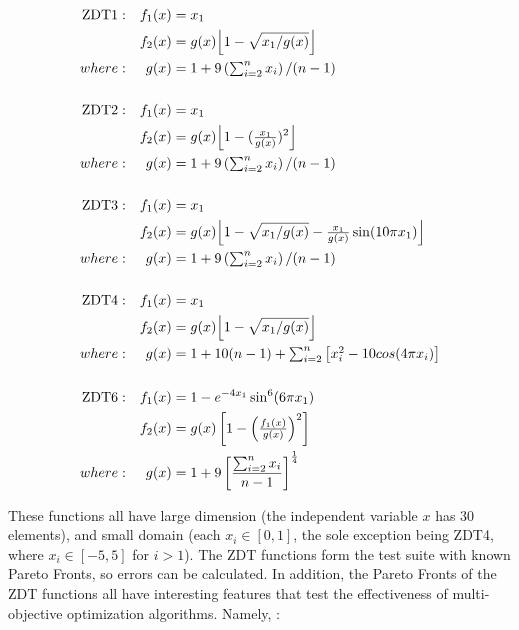 \documentclass[letterpaper, 10 pt, conference]{ieeeconf}  %
\DeclarePairedDelimiter\floor{\lfloor}{\rfloor}
\begin{document}
\begin{align*}
\text{ZDT1}: 	&	& f_1(x) & = x_1 \\
	  		&	& f_2(x) & = g(x) \floor[\Big]{1 - \sqrt{x_1/g(x)}} \\
where: 		& 	& g(x) & = 1 + 9 \left( \textstyle\sum\nolimits_{i=2}^{n} x_i \right)/(n-1) \\
\\
\text{ZDT2}: 	&	& f_1(x) & = x_1 \\
	  		&	& f_2(x) & = g(x) \floor[\Big]{1 - (\tfrac{x_1}{g(x)}) ^2} \\
where: 		& 	& g(x) & = 1 + 9 \left( \textstyle\sum\nolimits_{i=2}^{n} x_i \right)/(n-1) \\ 
\\
\text{ZDT3}: 	&	& f_1(x) & = x_1 \\
	  		&	& f_2(x) & = g(x) \floor[\Big]{1 - \sqrt{x_1/g(x)} - \tfrac{x_1}{g(x)} \sin(10 \pi x_1) } \\
where: 		& 	& g(x) & = 1 + 9 \left( \textstyle\sum\nolimits_{i=2}^{n} x_i \right)/(n-1) \\ 
\\
\text{ZDT4}: 	&	& f_1(x) & = x_1 \\
	  		&	& f_2(x) & = g(x) \floor[\Big]{ 1 - \sqrt{x_1 / g(x)}} \\
where: 		& 	& g(x) & = 1 + 10(n - 1) + \textstyle\sum\nolimits_{i=2}^n{\left[ x_i^2 - 10 cos(4 \pi x_i ) \right]} \\ 
\\
\text{ZDT6}: 	&	& f_1(x) & = 1 - e^{-4x_1} \sin^6(6 \pi x_1) \\
	 		&	& f_2(x) & = g(x) \left[ 1 - \left( \tfrac{f_1(x)}{g(x)} \right)^2 \right] \\
where: 		& 	& g(x) & = 1 + 9 \left[ \frac{\textstyle\sum\nolimits_{i=2}^{n} x_i}{n-1} \right]^{\frac{1}{4}}
\end{align*}

These functions all have large dimension (the independent variable $x$ has 30 elements), and small domain (each $x_i \in [0, 1]$, the sole exception being ZDT4, where $x_i \in [-5, 5]$ for $i > 1$). The ZDT functions form the test suite with known Pareto Fronts, so errors can be calculated. In addition, the Pareto Fronts of the ZDT functions all have interesting features that test the effectiveness of multi-objective optimization algorithms. Namely, \cite{ZDTFunsPaper}:
\end{document}

